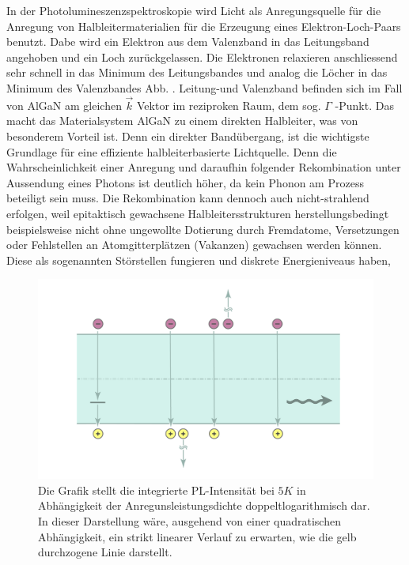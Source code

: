 \raggedright
%
In der Photolumineszenzspektroskopie wird Licht als Anregungsquelle für die Anregung von Halbleitermaterialien für die Erzeugung eines Elektron-Loch-Paars benutzt. Dabe wird ein Elektron aus dem Valenzband in das Leitungsband angehoben und ein Loch zurückgelassen. Die Elektronen relaxieren anschliessend sehr schnell in das Minimum des Leitungsbandes und analog die Löcher in das Minimum des Valenzbandes Abb. . Leitung-und Valenzband befinden sich im Fall von AlGaN am gleichen $\vec{k}$ Vektor im reziproken Raum, dem sog. $\Gamma$ -Punkt. Das macht das Materialsystem AlGaN zu einem direkten Halbleiter, was von besonderem Vorteil ist. Denn ein direkter Bandübergang, ist die wichtigste Grundlage für eine effiziente halbleiterbasierte Lichtquelle. Denn die Wahrscheinlichkeit einer Anregung und daraufhin folgender Rekombination unter Aussendung eines Photons ist deutlich höher, da kein Phonon am Prozess beteiligt sein muss. 
Die Rekombination kann dennoch auch nicht-strahlend erfolgen, weil epitaktisch gewachsene Halbleitersstrukturen herstellungsbedingt beispielsweise nicht ohne ungewollte Dotierung durch Fremdatome, Versetzungen oder Fehlstellen an Atomgitterplätzen (Vakanzen) gewachsen werden können. Diese als sogenannten Störstellen fungieren und diskrete Energieniveaus haben, 
%
\begin{figure}[h]
    \centering
    \begin{minipage}[t]{0.5\linewidth}
        \centering
        \includegraphics[width=\linewidth]{Bilder/rekbomChannels.png}
        \caption{Die Grafik stellt die integrierte PL-Intensität bei $5K$ in Abhängigkeit der Anregunsleistungsdichte doppeltlogarithmisch dar. In dieser Darstellung wäre, ausgehend von einer quadratischen Abhängigkeit, ein strikt linearer Verlauf zu erwarten, wie die gelb durchzogene Linie darstellt. }
        \label{fig:rekombChannels}
    \end{minipage}%
\end{figure}
